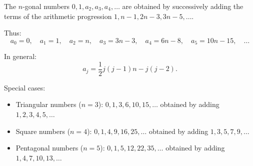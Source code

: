 The $n$-gonal numbers $0, 1, a_2, a_3, a_4, \ldots$ are obtained by successively adding the terms of the arithmetic progression $1, n-1, 2n-3, 3n-5, \ldots$.

Thus:
$$
a_0 = 0,\quad a_1 = 1,\quad a_2 = n,\quad a_3 = 3n - 3,\quad a_4 = 6n - 8,\quad a_5 = 10n - 15,\quad \ldots
$$

In general:
$$
a_j = \frac{1}{2}j(j-1)n - j(j-2).
$$

Special cases:
\begin{itemize}
\item Triangular numbers ($n=3$): $0, 1, 3, 6, 10, 15, \ldots$ obtained by adding $1, 2, 3, 4, 5, \ldots$
\item Square numbers ($n=4$): $0, 1, 4, 9, 16, 25, \ldots$ obtained by adding $1, 3, 5, 7, 9, \ldots$
\item Pentagonal numbers ($n=5$): $0, 1, 5, 12, 22, 35, \ldots$ obtained by adding $1, 4, 7, 10, 13, \ldots$
\end{itemize}
